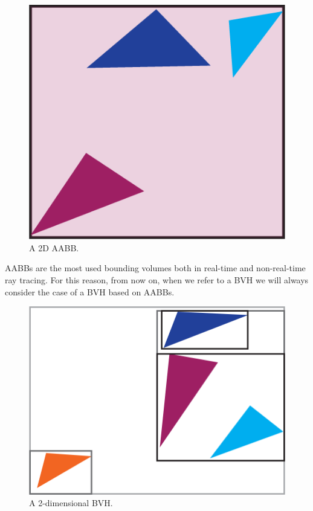 \documentclass{PoliMi_MasterThesis}
\begin{document}
\begin{figure}[H]
    \centering
    \includegraphics[width=\textwidth*\real{0.25}]{Images/aabb_slack.png}
    \caption{A 2D AABB.}
    \label{fig:aabb}
\end{figure}

AABBs are the most used bounding volumes both in real-time and non-real-time ray tracing. For this reason, from now on, when we refer to a BVH we will always consider the case of a BVH based on AABBs.

\begin{figure}[H]
    \centering
    \includegraphics[width=\textwidth*\real{0.45}]{Images/bvh_2d.png}
    \caption{A 2-dimensional BVH.}
    \label{fig:bvh_2d}
\end{figure}
\end{document}
